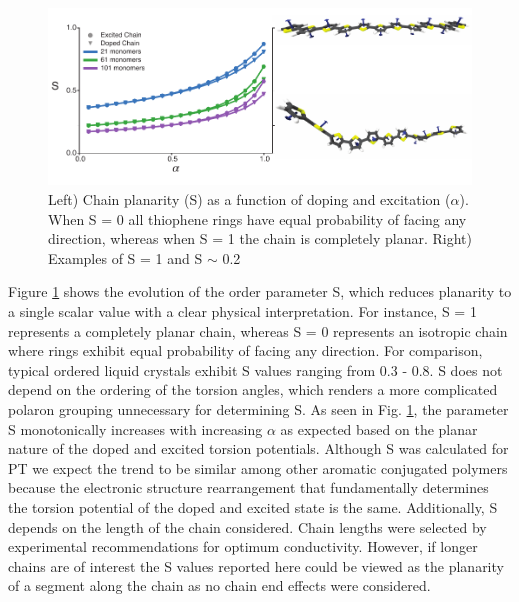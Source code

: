 \begin{figure}
    \centering
    \includegraphics{figures/chap2/S.pdf}
    \caption{Left) Chain planarity (S) as a function of doping and excitation ($\alpha$). When S = 0 all thiophene rings have equal probability of facing any direction, whereas when S = 1 the chain is completely planar. Right) Examples of S = 1 and S $\sim$ 0.2}
    \label{fig:s_order}
\end{figure}

Figure \ref{fig:s_order} shows the evolution of the order parameter S, which reduces planarity to a single scalar value with a clear physical interpretation. For instance, S = 1 represents a completely planar chain, whereas S = 0 represents an isotropic chain where rings exhibit equal probability of facing any direction. For comparison, typical ordered liquid crystals exhibit S values ranging from 0.3 - 0.8.\cite{Colfen2008} S does not depend on the ordering of the torsion angles, which renders a more complicated polaron grouping unnecessary for determining S. As seen in Fig. \ref{fig:s_order}, the parameter S monotonically increases with increasing $\alpha$ as expected based on the planar nature of the doped and excited torsion potentials. Although S was calculated for PT we expect the trend to be similar among other aromatic conjugated polymers because the electronic structure rearrangement that fundamentally determines the torsion potential of the doped and excited state is the same. Additionally, S depends on the length of the chain considered. Chain lengths were selected by experimental recommendations for optimum conductivity.\cite{Noriega2013} However, if longer chains are of interest the S values reported here could be viewed as the planarity of a segment along the chain as no chain end effects were considered.

